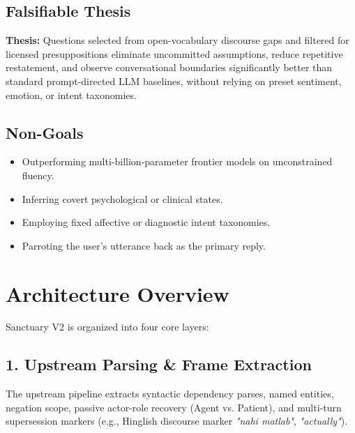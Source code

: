 \documentclass[11pt,a4paper]{article}
\begin{document}
\subsection{Falsifiable Thesis}
\textbf{Thesis:} Questions selected from open-vocabulary discourse gaps and filtered for licensed presuppositions eliminate uncommitted assumptions, reduce repetitive restatement, and observe conversational boundaries significantly better than standard prompt-directed LLM baselines, without relying on preset sentiment, emotion, or intent taxonomies.

\subsection{Non-Goals}
\begin{itemize}
    \item Outperforming multi-billion-parameter frontier models on unconstrained fluency.
    \item Inferring covert psychological or clinical states.
    \item Employing fixed affective or diagnostic intent taxonomies.
    \item Parroting the user's utterance back as the primary reply.
\end{itemize}

\section{Architecture Overview}

Sanctuary V2 is organized into four core layers:

\subsection{1. Upstream Parsing \& Frame Extraction}
The upstream pipeline extracts syntactic dependency parses, named entities, negation scope, passive actor-role recovery (Agent vs. Patient), and multi-turn supersession markers (e.g., Hinglish discourse marker \emph{"nahi matlab"}, \emph{"actually"}).
\end{document}
